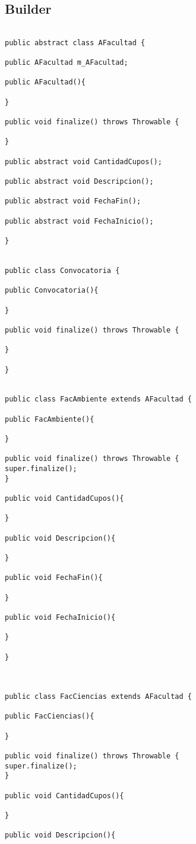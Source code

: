 \subsection{Builder}
\begin{lstlisting}

public abstract class AFacultad {

public AFacultad m_AFacultad;

public AFacultad(){

}

public void finalize() throws Throwable {

}

public abstract void CantidadCupos();

public abstract void Descripcion();

public abstract void FechaFin();

public abstract void FechaInicio();

}


public class Convocatoria {

public Convocatoria(){

}

public void finalize() throws Throwable {

}

}


public class FacAmbiente extends AFacultad {

public FacAmbiente(){

}

public void finalize() throws Throwable {
super.finalize();
}

public void CantidadCupos(){

}

public void Descripcion(){

}

public void FechaFin(){

}

public void FechaInicio(){

}

}



public class FacCiencias extends AFacultad {

public FacCiencias(){

}

public void finalize() throws Throwable {
super.finalize();
}

public void CantidadCupos(){

}

public void Descripcion(){


\end{lstlisting}
